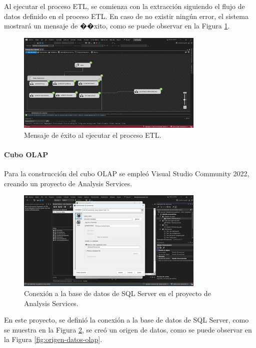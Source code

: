 Al ejecutar el proceso ETL, se comienza con la extracción siguiendo el flujo de datos definido en el proceso ETL. En caso de no
existir ningún error, el sistema mostrará un mensaje de ��xito, como se puede observar en la Figura \ref{fig:exito-bi}.

\begin{figure}[H]
    \centering
    \includegraphics[width=0.8\textwidth]{chapters/III-resultados-y-discusion/resources/images/exito-bi.png}
    \caption{Mensaje de éxito al ejecutar el proceso ETL.}
    \label{fig:exito-bi}
\end{figure}

\paragraph{Cubo OLAP}
Para la construcción del cubo OLAP se empleó Visual Studio Community 2022, creando un proyecto de Analysis Services.

\begin{figure}[H]
    \centering
    \includegraphics[width=0.8\textwidth]{chapters/III-resultados-y-discusion/resources/images/conexion-olap.png}
    \caption{Conexión a la base de datos de SQL Server en el proyecto de Analysis Services.}
    \label{fig:conexion-olap}
\end{figure}

En este proyecto, se definió la conexión a la base de datos de SQL Server, como se muestra en la Figura \ref{fig:conexion-olap},
se creó un origen de datos, como se puede observar en la Figura \ref{fig:origen-datos-olap}.

